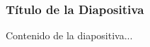 \documentclass{beamer}
\begin{document}
\begin{frame}
    \frametitle{Título de la Diapositiva}
    Contenido de la diapositiva...
\end{frame}
\end{document}
